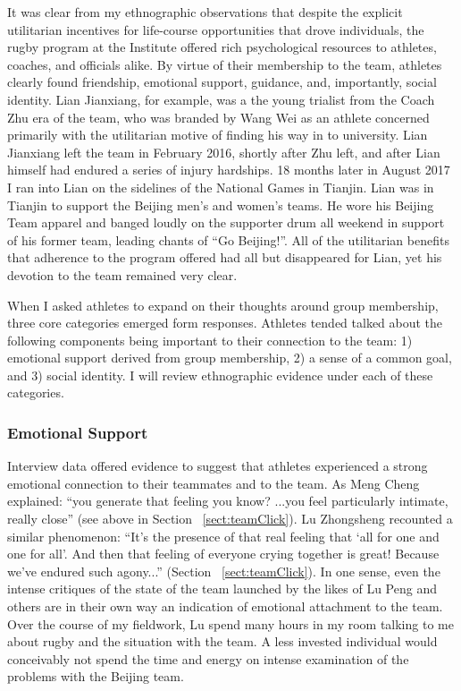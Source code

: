\begin{CJK}{UTF8}{gbsn}
It was clear from my ethnographic observations that despite the explicit utilitarian incentives for life-course opportunities that drove individuals, the rugby program at the Institute offered rich psychological resources to athletes, coaches, and officials alike.  By virtue of their membership to the team, athletes clearly found friendship, emotional support, guidance, and, importantly, social identity.  Lian Jianxiang, for example, was a the young trialist from the Coach Zhu era of the team, who was branded by Wang Wei as an athlete concerned primarily with the utilitarian motive of finding his way in to university.  Lian Jianxiang left the team in February 2016, shortly after Zhu left, and after Lian himself had endured a series of injury hardships.  18 months later in August 2017 I ran into Lian on the sidelines of the National Games in Tianjin. Lian was in Tianjin to support the Beijing men's and women's teams.  He wore his Beijing Team apparel and banged loudly on the supporter drum all weekend in support of his former team, leading chants of ``Go Beijing!''.  All of the utilitarian benefits that adherence to the program offered had all but disappeared for Lian, yet his devotion to the team remained very clear.

When I asked athletes to expand on their thoughts around group membership, three core categories emerged form responses.  Athletes tended talked about the following components being important to their connection to the team: 1) emotional support derived from group membership, 2) a sense of a common goal, and 3) social identity. I will review ethnographic evidence under each of these categories.


  \subsubsection{Emotional Support}

Interview data offered evidence to suggest that athletes experienced a strong emotional connection to their teammates and to the team.  As Meng Cheng explained: ``you generate that feeling you know? ...you feel particularly intimate, really close'' (see above in Section ~\ref{sect:teamClick}).  Lu Zhongsheng recounted a similar phenomenon: ``It's the presence of that real feeling that `all for one and one for all'.  And then that feeling of everyone crying together is great! Because we've endured such agony...'' (Section ~\ref{sect:teamClick}). In one sense, even the intense critiques of the state of the team launched by the likes of Lu Peng and others are in their own way an indication of emotional attachment to the team. Over the course of my fieldwork, Lu spend many hours in my room talking to me about rugby and the situation with the team.  A less invested individual would conceivably not spend the time and energy on intense examination of the problems with the Beijing team.


\end{CJK}
